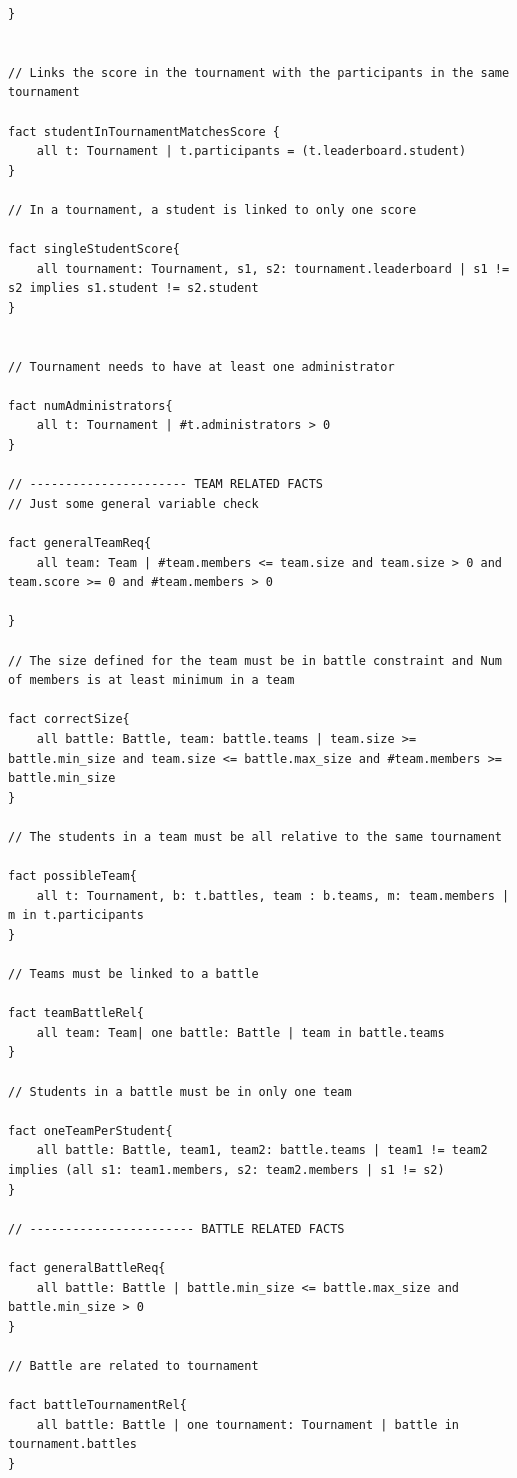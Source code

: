 \begin{lstlisting}[language=alloy,label={lst:alloy_code}]
}


// Links the score in the tournament with the participants in the same tournament

fact studentInTournamentMatchesScore {
    all t: Tournament | t.participants = (t.leaderboard.student)
}

// In a tournament, a student is linked to only one score

fact singleStudentScore{
    all tournament: Tournament, s1, s2: tournament.leaderboard | s1 != s2 implies s1.student != s2.student
}


// Tournament needs to have at least one administrator

fact numAdministrators{
    all t: Tournament | #t.administrators > 0
}

// ---------------------- TEAM RELATED FACTS
// Just some general variable check

fact generalTeamReq{
    all team: Team | #team.members <= team.size and team.size > 0 and team.score >= 0 and #team.members > 0
    
}

// The size defined for the team must be in battle constraint and Num of members is at least minimum in a team

fact correctSize{
    all battle: Battle, team: battle.teams | team.size >= battle.min_size and team.size <= battle.max_size and #team.members >= battle.min_size
}

// The students in a team must be all relative to the same tournament

fact possibleTeam{
    all t: Tournament, b: t.battles, team : b.teams, m: team.members | m in t.participants 
}

// Teams must be linked to a battle

fact teamBattleRel{
    all team: Team| one battle: Battle | team in battle.teams
}

// Students in a battle must be in only one team

fact oneTeamPerStudent{
    all battle: Battle, team1, team2: battle.teams | team1 != team2 implies (all s1: team1.members, s2: team2.members | s1 != s2)
}

// ----------------------- BATTLE RELATED FACTS

fact generalBattleReq{
    all battle: Battle | battle.min_size <= battle.max_size and battle.min_size > 0
}

// Battle are related to tournament

fact battleTournamentRel{
    all battle: Battle | one tournament: Tournament | battle in tournament.battles
}


\end{lstlisting}

